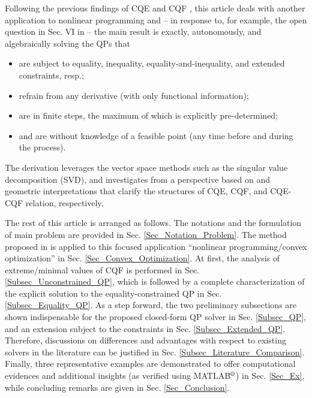 \documentclass{imaman}
\numberwithin{equation}{section}
\begin{document}
Following the previous findings of CQE and CQF \citep{LiLiHs:20}, this article deals with another application to nonlinear programming and -- in response to, for example, the open question in Sec. VI in \cite{DuJoWaWi:15} -- the main result is exactly, autonomously, and algebraically solving the QPs that
\begin{itemize}
\item are subject to equality, inequality, equality-and-inequality, and extended constraints, resp.;
\item refrain from any derivative (with only functional information);
\item are in finite steps, the maximum of which is explicitly pre-determined;
\item and are without knowledge of a feasible point (any time before and during the process).
\end{itemize}
The derivation leverages the vector space methods such as the singular value decomposition (SVD), and investigates from a perspective based on \cite{LiLiHs:20} and geometric interpretations that clarify the structures of CQE, CQF, and CQE-CQF relation, respectively.

The rest of this article is arranged as follows. The notations and the formulation of main problem are provided in Sec. \ref{Sec_Notation_Problem}. The method proposed in \cite{LiLiHs:20} is applied to this focused application ``nonlinear programming/convex optimization'' in Sec. \ref{Sec_Convex_Optimization}. At first, the analysis of extreme/minimal values of CQF is performed in Sec. \ref{Subsec_Unconstrained_QP}, which is followed by a complete characterization of the explicit solution to the equality-constrained QP in Sec. \ref{Subsec_Equality_QP}. As a step forward, the two preliminary subsections are shown indispensable for the proposed closed-form QP solver in Sec. \ref{Subsec_QP}, and an extension subject to the constraints in Sec. \ref{Subsec_Extended_QP}. Therefore, discussions on differences and advantages with respect to existing solvers in the literature can be justified in Sec. \ref{Subsec_Literature_Comparison}. Finally, three representative examples are demonstrated to offer computational evidences and additional insights (as verified using MATLAB$\textsuperscript{\textregistered}$) in Sec. \ref{Sec_Ex}, while concluding remarks are given in Sec. \ref{Sec_Conclusion}.
\end{document}

